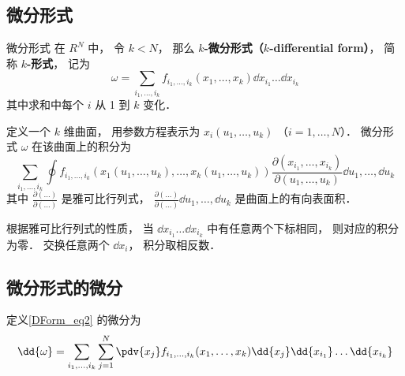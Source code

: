 \subsection{微分形式}
\begin{definition}{微分形式}
在 $R^N$ 中， 令 $k < N$， 那么 \textbf{$k$-微分形式（$k$-differential form）}， 简称 \textbf{$k$-形式}， 记为
\begin{equation}\label{DForm_eq2}
\omega = \sum_{i_1,\dots,i_k} f_{i_1,\dots,i_k}(x_1,\dots,x_k) \dd{x_{i_1}}\dots\dd{x_{i_k}}
\end{equation}
其中求和中每个 $i$ 从 1 到 $k$ 变化．

定义一个 $k$ 维曲面， 用参数方程表示为 $x_i(u_1,\dots,u_k)$ （$i=1,\dots,N$）． 微分形式 $\omega$ 在该曲面上的积分为
\begin{equation}
\sum_{i_1,\dots,i_k} \oint f_{i_1,\dots,i_k}(x_1(u_1,\dots,u_k),\dots,x_k(u_1,\dots,u_k)) \frac{\partial(x_{i_1},\dots,x_{i_k})}{\partial(u_1,\dots,u_k)} \dd{u_1},\dots,\dd{u_k}
\end{equation}
其中 $\frac{\partial(\dots)}{\partial(\dots)}$ 是雅可比行列式， $\frac{\partial(\dots)}{\partial(\dots)}\dd{u_1},\dots,\dd{u_k}$ 是曲面上的有向表面积．
\end{definition}
根据雅可比行列式的性质， 当 $\dd{x_{i_1}}\dots\dd{x_{i_k}}$ 中有任意两个下标相同， 则对应的积分为零． 交换任意两个 $\dd{x_i}$， 积分取相反数．

\subsection{微分形式的微分}
定义\autoref{DForm_eq2} 的微分为
\begin{equation}
\dd{\omega} = \sum_{i_1,\dots,i_k}\sum_{j=1}^N \pdv{x_j} f_{i_1,\dots,i_k}(x_1,\dots,x_k) \dd{x_j}\dd{x_{i_1}}\dots\dd{x_{i_k}}
\end{equation}

